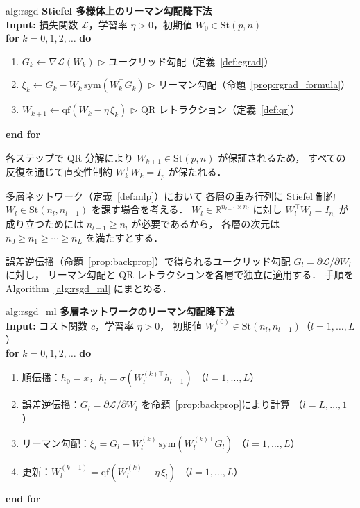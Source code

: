 \documentclass[uplatex, dvipdfmx]{jsarticle}
\begin{document}
\begin{algorithm}{alg:rsgd}
\textbf{Stiefel 多様体上のリーマン勾配降下法} \\[4pt]
\textbf{Input:} 損失関数 $\mathcal{L}$，学習率 $\eta > 0$，初期値 $W_0 \in \mathrm{St}(p,n)$ \\[4pt]
\textbf{for} $k = 0, 1, 2, \ldots$ \textbf{do}
\begin{enumerate}
  \setlength{\itemsep}{2pt}
  \item $G_k \gets \nabla \mathcal{L}(W_k)$
    \hfill $\triangleright$ ユークリッド勾配（定義~\ref{def:egrad}）
  \item $\xi_k \gets G_k - W_k\,\mathrm{sym}(W_k^\top G_k)$
    \hfill $\triangleright$ リーマン勾配（命題~\ref{prop:rgrad_formula}）
  \item $W_{k+1} \gets \mathrm{qf}(W_k - \eta\,\xi_k)$
    \hfill $\triangleright$ QR レトラクション（定義~\ref{def:qr}）
\end{enumerate}
\textbf{end for}
\end{algorithm}

各ステップで QR 分解により $W_{k+1}\in\mathrm{St}(p,n)$ が保証されるため，
すべての反復を通じて直交性制約 $W_k^\top W_k = I_p$ が保たれる．

多層ネットワーク（定義~\ref{def:mlp}）において
各層の重み行列に Stiefel 制約 $W_l\in\mathrm{St}(n_l,n_{l-1})$ を課す場合を考える．
$W_l\in\mathbb{R}^{n_{l-1}\times n_l}$ に対し
$W_l^\top W_l = I_{n_l}$ が成り立つためには $n_{l-1}\ge n_l$ が必要であるから，
各層の次元は $n_0\ge n_1\ge\cdots\ge n_L$ を満たすとする．

誤差逆伝播（命題~\ref{prop:backprop}）で得られるユークリッド勾配
$G_l=\partial\mathcal{L}/\partial W_l$ に対し，
リーマン勾配と QR レトラクションを各層で独立に適用する．
手順を Algorithm~\ref{alg:rsgd_ml} にまとめる．

\begin{algorithm}{alg:rsgd_ml}
\textbf{多層ネットワークのリーマン勾配降下法} \\[4pt]
\textbf{Input:} コスト関数 $c$，学習率 $\eta > 0$，
初期値 $W_l^{(0)} \in \mathrm{St}(n_l,n_{l-1})$（$l=1,\ldots,L$） \\[4pt]
\textbf{for} $k = 0, 1, 2, \ldots$ \textbf{do}
\begin{enumerate}
  \setlength{\itemsep}{2pt}
  \item 順伝播：$h_0=x$，\;$h_l = \sigma(W_l^{(k)\top} h_{l-1})$
    \hfill（$l=1,\ldots,L$）
  \item 誤差逆伝播：$G_l = \partial\mathcal{L}/\partial W_l$
    を命題~\ref{prop:backprop}により計算
    \hfill（$l=L,\ldots,1$）
  \item リーマン勾配：$\xi_l = G_l - W_l^{(k)}\,\mathrm{sym}(W_l^{(k)\top} G_l)$
    \hfill（$l=1,\ldots,L$）
  \item 更新：$W_l^{(k+1)} = \mathrm{qf}(W_l^{(k)} - \eta\,\xi_l)$
    \hfill（$l=1,\ldots,L$）
\end{enumerate}
\textbf{end for}
\end{algorithm}
\end{document}

